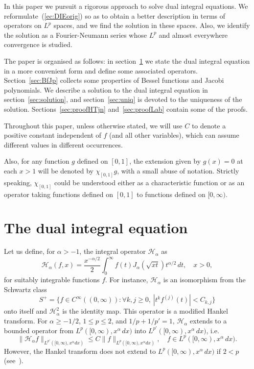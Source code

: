 \documentclass[12pt,leqno]{amsart}
\theoremstyle{plain}
\newcommand{\lpnorm}[3]{\|{#1}\|_{L^{#2}({#3})}} %
\newcommand{\htra}{\mathcal{H}_\alpha} %
\begin{document}
In this paper we pursuit a rigorous approach to solve dual integral equations.
We reformulate~(\ref{ec:DIEorig}) so as to obtain a better description in
terms of operators on $L^p$ spaces, and we find the solution in these
spaces. Also, we identify the solution as a Fourier-Neumann series whose $L^p$
and almost everywhere convergence is studied.

The paper is organised as follows: in section~\ref{sec:die} we state the dual
integral equation in a more convenient form and define some associated
operators. Section~\ref{sec:BfJp} collects some properties of Bessel functions
and Jacobi polynomials. We describe a solution to the dual integral equation
in section~\ref{sec:solution}, and section~\ref{sec:uniq} is devoted to the
uniqueness of the solution. Sections~\ref{sec:proofHTjn}
and~\ref{sec:proofLab} contain some of the proofs.

Throughout this paper, unless otherwise stated, we will use $C$ to denote a
positive constant independent of $f$ (and all other variables), which can
assume different values in different occurrences.

Also, for any function $g$ defined on $[0,1]$, the extension given by $g(x) =
0$ at each $x > 1$ will be denoted by $\chi_{[0,1]} g$, with a small abuse of
notation. Strictly speaking, $\chi_{[0,1]}$ could be understood either as a
characteristic function or as an operator taking functions defined on $[0,1]$
to functions defined on $[0,\infty)$.

\section{The dual integral equation}
\label{sec:die}

Let us define, for $\alpha > -1$, the integral operator $\htra$ as
\begin{equation*}
    \htra(f,x) = \frac{x^{-\alpha/2}}{2}
     \int_0^\infty {f(t)J_\alpha (\sqrt {xt})t^{\alpha/2}\,dt},
     \quad x > 0,
\end{equation*}
for suitably integrable functions $f$. For instance, $\htra$ is an
isomorphism from the Schwartz class
\begin{equation*}
    S^+ = \{ f \in C^\infty((0,\infty)) : \forall k,j \ge 0,
    \ |t^kf^{(j)}(t)| < C_{k,j} \}
\end{equation*}
onto itself and $\htra^2$ is the identity map. This operator is a modified
Hankel transform. For $\alpha \geq -1/2$, $1 \leq p \leq 2$, and $1/p + 1/p'
= 1$, $\htra$ extends to a bounded operator from
$L^p([0,\infty),x^\alpha\,dx)$ into $L^{p'}([0,\infty),x^\alpha\,dx)$, i.e.
\begin{equation*}
    \lpnorm{\htra f}{p'}{[0,\infty),x^\alpha dx}
      \le C \lpnorm{f}p{[0,\infty),x^\alpha dx},
      \quad f \in L^p([0,\infty),x^\alpha\,dx).
\end{equation*}
However, the Hankel transform does not extend to
$L^p([0,\infty),x^\alpha\,dx)$ if $2 < p$ (see~\cite{Dur, St-Tr, Var}).
\end{document}
